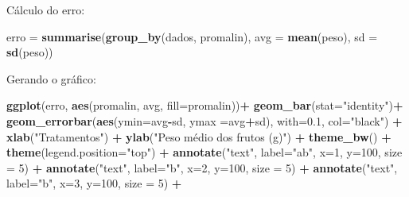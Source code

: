 \documentclass[
]{book}
\newenvironment{Shaded}{\begin{snugshade}}{\end{snugshade}}
\newcommand{\DataTypeTok}[1]{\textcolor[rgb]{0.13,0.29,0.53}{#1}}
\newcommand{\DecValTok}[1]{\textcolor[rgb]{0.00,0.00,0.81}{#1}}
\newcommand{\FloatTok}[1]{\textcolor[rgb]{0.00,0.00,0.81}{#1}}
\newcommand{\KeywordTok}[1]{\textcolor[rgb]{0.13,0.29,0.53}{\textbf{#1}}}
\newcommand{\NormalTok}[1]{#1}
\newcommand{\OperatorTok}[1]{\textcolor[rgb]{0.81,0.36,0.00}{\textbf{#1}}}
\newcommand{\StringTok}[1]{\textcolor[rgb]{0.31,0.60,0.02}{#1}}
\begin{document}
Cálculo do erro:

\begin{Shaded}
\begin{Highlighting}[]
\NormalTok{erro =}\StringTok{ }\KeywordTok{summarise}\NormalTok{(}\KeywordTok{group_by}\NormalTok{(dados, promalin), }
       \DataTypeTok{avg =} \KeywordTok{mean}\NormalTok{(peso), }\DataTypeTok{sd =} \KeywordTok{sd}\NormalTok{(peso))}
\end{Highlighting}
\end{Shaded}

Gerando o gráfico:

\begin{Shaded}
\begin{Highlighting}[]
\KeywordTok{ggplot}\NormalTok{(erro, }\KeywordTok{aes}\NormalTok{(promalin, avg, }\DataTypeTok{fill=}\NormalTok{promalin))}\OperatorTok{+}
\StringTok{  }\KeywordTok{geom_bar}\NormalTok{(}\DataTypeTok{stat=}\StringTok{"identity"}\NormalTok{)}\OperatorTok{+}
\StringTok{  }\KeywordTok{geom_errorbar}\NormalTok{(}\KeywordTok{aes}\NormalTok{(}\DataTypeTok{ymin=}\NormalTok{avg}\OperatorTok{-}\NormalTok{sd, }\DataTypeTok{ymax =}\NormalTok{avg}\OperatorTok{+}\NormalTok{sd), }\DataTypeTok{with=}\FloatTok{0.1}\NormalTok{, }\DataTypeTok{col=}\StringTok{"black"}\NormalTok{) }\OperatorTok{+}
\StringTok{    }\KeywordTok{xlab}\NormalTok{(}\StringTok{"Tratamentos"}\NormalTok{) }\OperatorTok{+}\StringTok{ }
\StringTok{    }\KeywordTok{ylab}\NormalTok{(}\StringTok{"Peso médio dos frutos (g)"}\NormalTok{) }\OperatorTok{+}\StringTok{ }
\StringTok{  }\KeywordTok{theme_bw}\NormalTok{() }\OperatorTok{+}\StringTok{ }
\StringTok{  }\KeywordTok{theme}\NormalTok{(}\DataTypeTok{legend.position=}\StringTok{"top"}\NormalTok{) }\OperatorTok{+}
\StringTok{      }\KeywordTok{annotate}\NormalTok{(}\StringTok{"text"}\NormalTok{, }\DataTypeTok{label=}\StringTok{"ab"}\NormalTok{, }\DataTypeTok{x=}\DecValTok{1}\NormalTok{, }\DataTypeTok{y=}\DecValTok{100}\NormalTok{, }\DataTypeTok{size =} \DecValTok{5}\NormalTok{)  }\OperatorTok{+}
\StringTok{      }\KeywordTok{annotate}\NormalTok{(}\StringTok{"text"}\NormalTok{, }\DataTypeTok{label=}\StringTok{"b"}\NormalTok{, }\DataTypeTok{x=}\DecValTok{2}\NormalTok{, }\DataTypeTok{y=}\DecValTok{100}\NormalTok{, }\DataTypeTok{size =} \DecValTok{5}\NormalTok{) }\OperatorTok{+}
\StringTok{      }\KeywordTok{annotate}\NormalTok{(}\StringTok{"text"}\NormalTok{, }\DataTypeTok{label=}\StringTok{"b"}\NormalTok{, }\DataTypeTok{x=}\DecValTok{3}\NormalTok{, }\DataTypeTok{y=}\DecValTok{100}\NormalTok{, }\DataTypeTok{size =} \DecValTok{5}\NormalTok{)  }\OperatorTok{+}

\end{Highlighting}
\end{Shaded}
\end{document}
